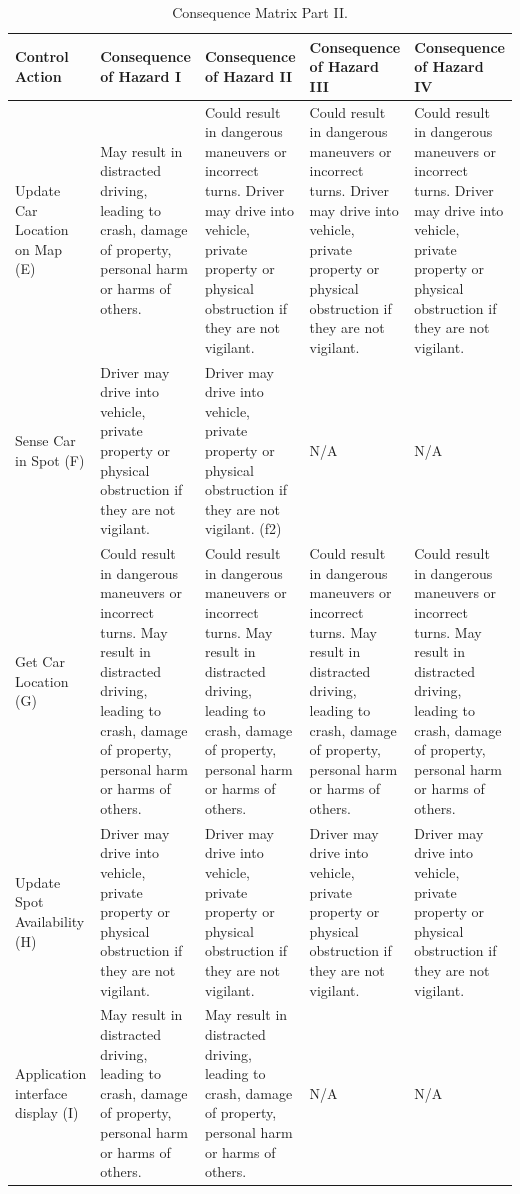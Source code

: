 \documentclass[]{article}
\begin{document}
\begin{table}
	\begin{tabular}{ | m{2.5cm} | m{3cm}| m{3cm}| m{3cm}| m{3cm} |} 
		\hline
		Control Action & 
		Consequence of Hazard I
		& 
		Consequence of Hazard II
		& 
		Consequence of Hazard III
		& 
		Consequence of Hazard IV
		\\ [0.5ex]
		\hline
		Update Car Location on Map (E) & May result in distracted driving, leading to crash, damage of property, personal harm or harms of others. & Could result in dangerous maneuvers or incorrect turns. Driver may drive into vehicle, private property or physical obstruction if they are not vigilant.  & Could result in dangerous maneuvers or incorrect turns. Driver may drive into vehicle, private property or physical obstruction if they are not vigilant.  & Could result in dangerous maneuvers or incorrect turns. Driver may drive into vehicle, private property or physical obstruction if they are not vigilant.  \\	
		\hline
		Sense Car in Spot (F) & Driver may drive into vehicle, private property or physical obstruction if they are not vigilant. & Driver may drive into vehicle, private property or physical obstruction if they are not vigilant. (f2) & N/A & N/A \\ 
		\hline
		Get Car Location (G) & Could result in dangerous maneuvers or incorrect turns. May result in distracted driving, leading to crash, damage of property, personal harm or harms of others. & Could result in dangerous maneuvers or incorrect turns. May result in distracted driving, leading to crash, damage of property, personal harm or harms of others. & Could result in dangerous maneuvers or incorrect turns. May result in distracted driving, leading to crash, damage of property, personal harm or harms of others. & Could result in dangerous maneuvers or incorrect turns. May result in distracted driving, leading to crash, damage of property, personal harm or harms of others.  \\	
		\hline
		Update Spot Availability (H) & Driver may drive into vehicle, private property or physical obstruction if they are not vigilant.& Driver may drive into vehicle, private property or physical obstruction if they are not vigilant. & Driver may drive into vehicle, private property or physical obstruction if they are not vigilant. & Driver may drive into vehicle, private property or physical obstruction if they are not vigilant.  \\	
		\hline
		Application interface display (I) & May result in distracted driving, leading to crash, damage of property, personal harm or harms of others. & May result in distracted driving, leading to crash, damage of property, personal harm or harms of others. & N/A & N/A \\	
		\hline
	\end{tabular}
\caption{Consequence Matrix Part II.}
\end{table}
\end{document}
